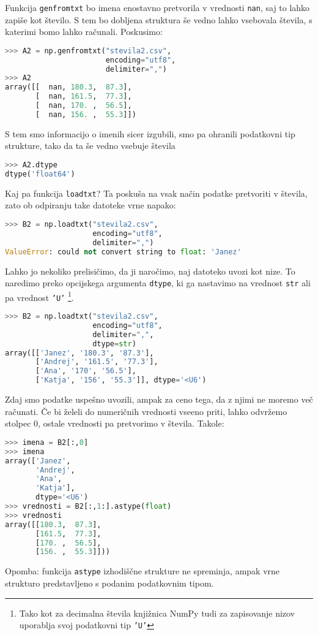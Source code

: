 Funkcija \texttt{genfromtxt} bo imena enostavno pretvorila v vrednosti \texttt{nan}, saj to lahko zapiše kot število. S tem bo dobljena struktura še vedno lahko vsebovala števila, s katerimi bomo lahko računali. Poskusimo:
\begin{lstlisting}[language=Python]
>>> A2 = np.genfromtxt("stevila2.csv",
                       encoding="utf8",
                       delimiter=",")
>>> A2
array([[  nan, 180.3,  87.3],
       [  nan, 161.5,  77.3],
       [  nan, 170. ,  56.5],
       [  nan, 156. ,  55.3]])
\end{lstlisting}
S tem smo informacijo o imenih sicer izgubili, smo pa ohranili podatkovni tip strukture, tako da ta še vedno vsebuje števila
\begin{lstlisting}[language=Python]
>>> A2.dtype
dtype('float64')
\end{lstlisting}
Kaj pa funkcija  \texttt{loadtxt}? Ta poskuša na vsak način podatke pretvoriti v števila, zato ob odpiranju take datoteke vrne napako:
\begin{lstlisting}[language=Python]
>>> B2 = np.loadtxt("stevila2.csv", 
                    encoding="utf8", 
                    delimiter=",")
ValueError: could not convert string to float: 'Janez'
\end{lstlisting}
Lahko jo nekoliko prelisičimo, da ji naročimo, naj datoteko uvozi kot nize. To naredimo preko opcijskega argumenta \texttt{dtype}, ki ga nastavimo na vrednost \texttt{str} ali pa vrednost \texttt{'U'} \footnote{Tako kot za decimalna števila knjižnica NumPy tudi za zapisovanje nizov uporablja svoj podatkovni tip \texttt{'U'} }. 
\begin{lstlisting}[language=Python]
>>> B2 = np.loadtxt("stevila2.csv", 
                    encoding="utf8", 
                    delimiter=",", 
                    dtype=str)
array([['Janez', '180.3', '87.3'],
       ['Andrej', '161.5', '77.3'],
       ['Ana', '170', '56.5'],
       ['Katja', '156', '55.3']], dtype='<U6')
\end{lstlisting}
Zdaj smo podatke uspešno uvozili, ampak za ceno tega, da z njimi ne moremo več računati. Če bi želeli do numeričnih vrednosti vseeno priti, lahko odvržemo stolpec 0, ostale vrednosti pa pretvorimo v števila. Takole:
\begin{lstlisting}[language=Python]
>>> imena = B2[:,0]
>>> imena
array(['Janez', 
       'Andrej', 
       'Ana', 
       'Katja'], 
       dtype='<U6')
>>> vrednosti = B2[:,1:].astype(float)
>>> vrednosti
array([[180.3,  87.3],
       [161.5,  77.3],
       [170. ,  56.5],
       [156. ,  55.3]]))
\end{lstlisting}
Opomba: funkcija \texttt{astype} izhodiščne strukture ne spreminja, ampak vrne strukturo predstavljeno s podanim podatkovnim tipom.

